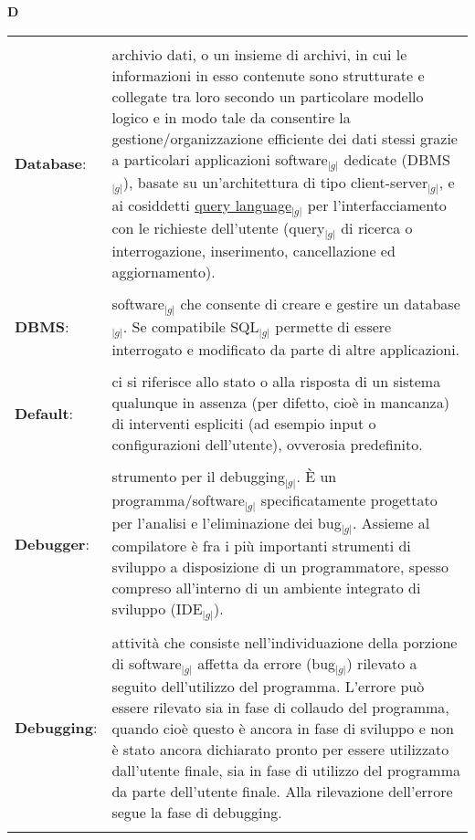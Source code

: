 \hfill\Huge{\textbf{D}}\\
\normalsize
	\begin{longtable}{p{} p{}} 
	    \toprule
	    \\
	    \textbf{Database}:		&	archivio dati, o un insieme di archivi, in cui le informazioni in esso contenute sono strutturate e collegate tra loro secondo un particolare modello logico e in modo tale da consentire la gestione/organizzazione efficiente dei 
						dati stessi grazie a particolari applicazioni software$_{|g|}$ dedicate (DBMS$_{|g|}$), basate su un'architettura di tipo client-server$_{|g|}$, e ai cosiddetti \underline{query language}$_{|g|}$ per l'interfacciamento con le richieste dell'utente 
						(query$_{|g|}$ di ricerca o interrogazione, inserimento, cancellazione ed aggiornamento).\\
	    \\
	    \textbf{DBMS}:		&	software$_{|g|}$ che consente di creare e gestire un database$_{|g|}$. Se compatibile SQL$_{|g|}$ permette di essere interrogato e modificato da parte di altre applicazioni.\\
	    \\
	    \textbf{Default}: 		&	ci si riferisce allo stato o alla risposta di un sistema qualunque in assenza (per difetto, cioè in mancanza) di interventi espliciti (ad esempio input o configurazioni dell'utente), ovverosia predefinito.\\
	    \\
	    \textbf{Debugger}:		&	strumento per il debugging$_{|g|}$. \`E un programma/software$_{|g|}$ specificatamente progettato per l'analisi e l'eliminazione dei bug$_{|g|}$. 
						Assieme al compilatore è fra i più importanti strumenti di sviluppo a disposizione di un programmatore, spesso compreso all'interno di un ambiente integrato di sviluppo (IDE$_{|g|}$).\\
	    \\
	    \textbf{Debugging}:		&	attività che consiste nell'individuazione della porzione di software$_{|g|}$ affetta da errore (bug$_{|g|}$) rilevato a seguito dell'utilizzo del programma. 
						L'errore può essere rilevato sia in fase di collaudo del programma, quando cioè questo è ancora in fase di sviluppo e non è stato ancora dichiarato pronto per essere utilizzato dall'utente finale, 
						sia in fase di utilizzo del programma da parte dell'utente finale. Alla rilevazione dell'errore segue la fase di debugging.\\
	    \\

\end{longtable}
